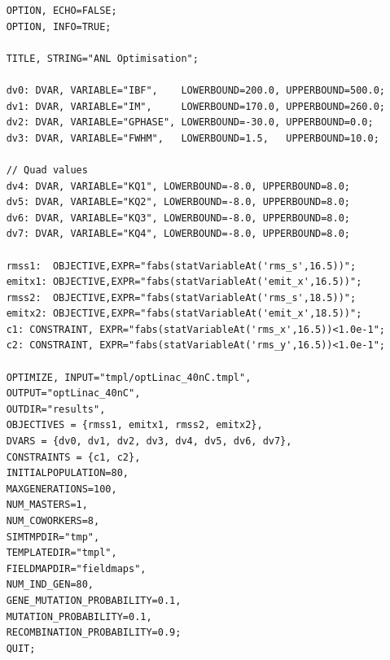 \documentclass[preprint,linenumbers,amsmath,amssymb,aps,prstab]{revtex4-1}%
\begin{document}
\begin{verbatim}
	OPTION, ECHO=FALSE;
	OPTION, INFO=TRUE;
	
	TITLE, STRING="ANL Optimisation";
	
	dv0: DVAR, VARIABLE="IBF",    LOWERBOUND=200.0, UPPERBOUND=500.0;
	dv1: DVAR, VARIABLE="IM",     LOWERBOUND=170.0, UPPERBOUND=260.0;
	dv2: DVAR, VARIABLE="GPHASE", LOWERBOUND=-30.0, UPPERBOUND=0.0;
	dv3: DVAR, VARIABLE="FWHM",   LOWERBOUND=1.5,   UPPERBOUND=10.0;
	
	// Quad values
	dv4: DVAR, VARIABLE="KQ1", LOWERBOUND=-8.0, UPPERBOUND=8.0;
	dv5: DVAR, VARIABLE="KQ2", LOWERBOUND=-8.0, UPPERBOUND=8.0;
	dv6: DVAR, VARIABLE="KQ3", LOWERBOUND=-8.0, UPPERBOUND=8.0;
	dv7: DVAR, VARIABLE="KQ4", LOWERBOUND=-8.0, UPPERBOUND=8.0;
	
	rmss1:  OBJECTIVE,EXPR="fabs(statVariableAt('rms_s',16.5))";
	emitx1: OBJECTIVE,EXPR="fabs(statVariableAt('emit_x',16.5))";
	rmss2:  OBJECTIVE,EXPR="fabs(statVariableAt('rms_s',18.5))";
	emitx2: OBJECTIVE,EXPR="fabs(statVariableAt('emit_x',18.5))";
	c1: CONSTRAINT, EXPR="fabs(statVariableAt('rms_x',16.5))<1.0e-1";
	c2: CONSTRAINT, EXPR="fabs(statVariableAt('rms_y',16.5))<1.0e-1";
	
	OPTIMIZE, INPUT="tmpl/optLinac_40nC.tmpl",
	OUTPUT="optLinac_40nC",
	OUTDIR="results",
	OBJECTIVES = {rmss1, emitx1, rmss2, emitx2},
	DVARS = {dv0, dv1, dv2, dv3, dv4, dv5, dv6, dv7},
	CONSTRAINTS = {c1, c2},
	INITIALPOPULATION=80,
	MAXGENERATIONS=100,
	NUM_MASTERS=1,
	NUM_COWORKERS=8,
	SIMTMPDIR="tmp",
	TEMPLATEDIR="tmpl",
	FIELDMAPDIR="fieldmaps",
	NUM_IND_GEN=80,
	GENE_MUTATION_PROBABILITY=0.1,
	MUTATION_PROBABILITY=0.1,
	RECOMBINATION_PROBABILITY=0.9;
	QUIT;
\end{verbatim}
\end{document}

